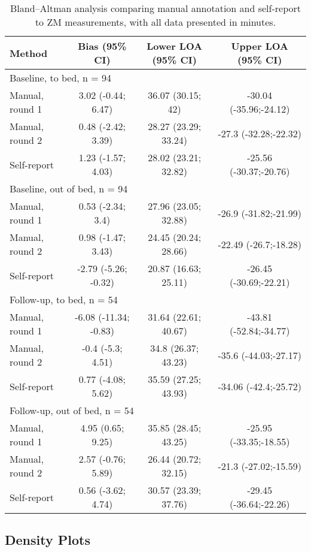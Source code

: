 \documentclass[
  10pt,
]{scrbook}
\begin{document}
\hypertarget{tbl-7}{}
\begin{longtable}{lccc}
\caption{\label{tbl-7}Bland--Altman analysis comparing manual annotation and self-report to ZM
measurements, with all data presented in minutes. }\tabularnewline

\toprule
Method & Bias  (95\% CI) & Lower LOA (95\% CI) & Upper LOA (95\% CI) \\ 
\midrule
\multicolumn{4}{l}{Baseline, to bed, n = 94} \\ 
\midrule
Manual, round 1 & 3.02 (-0.44; 6.47) & 36.07 (30.15; 42) & -30.04 (-35.96;-24.12) \\ 
Manual, round 2 & 0.48 (-2.42; 3.39) & 28.27 (23.29; 33.24) & -27.3 (-32.28;-22.32) \\ 
Self-report & 1.23 (-1.57; 4.03) & 28.02 (23.21; 32.82) & -25.56 (-30.37;-20.76) \\ 
\midrule
\multicolumn{4}{l}{Baseline, out of bed, n = 94} \\ 
\midrule
Manual, round 1 & 0.53 (-2.34; 3.4) & 27.96 (23.05; 32.88) & -26.9 (-31.82;-21.99) \\ 
Manual, round 2 & 0.98 (-1.47; 3.43) & 24.45 (20.24; 28.66) & -22.49 (-26.7;-18.28) \\ 
Self-report & -2.79 (-5.26; -0.32) & 20.87 (16.63; 25.11) & -26.45 (-30.69;-22.21) \\ 
\midrule
\multicolumn{4}{l}{Follow-up, to bed, n = 54} \\ 
\midrule
Manual, round 1 & -6.08 (-11.34; -0.83) & 31.64 (22.61; 40.67) & -43.81 (-52.84;-34.77) \\ 
Manual, round 2 & -0.4 (-5.3; 4.51) & 34.8 (26.37; 43.23) & -35.6 (-44.03;-27.17) \\ 
Self-report & 0.77 (-4.08; 5.62) & 35.59 (27.25; 43.93) & -34.06 (-42.4;-25.72) \\ 
\midrule
\multicolumn{4}{l}{Follow-up, out of bed, n = 54} \\ 
\midrule
Manual, round 1 & 4.95 (0.65; 9.25) & 35.85 (28.45; 43.25) & -25.95 (-33.35;-18.55) \\ 
Manual, round 2 & 2.57 (-0.76; 5.89) & 26.44 (20.72; 32.15) & -21.3 (-27.02;-15.59) \\ 
Self-report & 0.56 (-3.62; 4.74) & 30.57 (23.39; 37.76) & -29.45 (-36.64;-22.26) \\ 
\bottomrule
\end{longtable}

\endgroup

\hypertarget{density-plots}{%
\subsection{Density Plots}\label{density-plots}}
\end{document}
